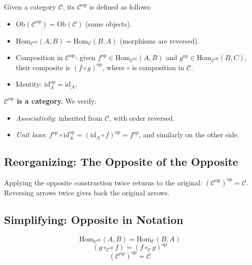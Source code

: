 Given a category $\mathcal{C}$, its 
$\mathcal{C}^{\mathrm{op}}$ is defined as follows:

\begin{itemize}
  \item $\mathrm{Ob}(\mathcal{C}^{\mathrm{op}}) = \mathrm{Ob}(\mathcal{C})$
        (same objects).
  \item $\mathrm{Hom}_{\mathcal{C}^{\mathrm{op}}}(A, B) =
        \mathrm{Hom}_{\mathcal{C}}(B, A)$ (morphisms are reversed).
  \item Composition in $\mathcal{C}^{\mathrm{op}}$: given
        $f^{\mathrm{op}} \in \mathrm{Hom}_{\mathcal{C}^{\mathrm{op}}}(A, B)$
        and $g^{\mathrm{op}} \in \mathrm{Hom}_{\mathcal{C}^{\mathrm{op}}}(B,C)$,
        their composite is $(f \circ g)^{\mathrm{op}}$, where $\circ$ is
        composition in $\mathcal{C}$.
  \item Identity: $\mathrm{id}_A^{\mathrm{op}} = \mathrm{id}_A$.
\end{itemize}

\textbf{$\mathcal{C}^{\mathrm{op}}$ is a category.} We verify:
\begin{itemize}
  \item \textit{Associativity}: inherited from $\mathcal{C}$, with order
        reversed.
  \item \textit{Unit laws}: $f^{\mathrm{op}} \circ \mathrm{id}_A^{\mathrm{op}}
        = (\mathrm{id}_A \circ f)^{\mathrm{op}} = f^{\mathrm{op}}$, and
        similarly on the other side.
\end{itemize}

\subsection{Reorganizing: The Opposite of the Opposite}

Applying the opposite construction twice returns to the original:
$(\mathcal{C}^{\mathrm{op}})^{\mathrm{op}} = \mathcal{C}$. Reversing arrows
twice gives back the original arrows.

\subsection{Simplifying: Opposite in Notation}

\[
  \mathrm{Hom}_{\mathcal{C}^{\mathrm{op}}}(A, B)
  = \mathrm{Hom}_{\mathcal{C}}(B, A)
\]
\[
  (g \circ_{\mathcal{C}^{\mathrm{op}}} f) = (f \circ_\mathcal{C} g)^{\mathrm{op}}
\]
\[
  (\mathcal{C}^{\mathrm{op}})^{\mathrm{op}} = \mathcal{C}
\]

